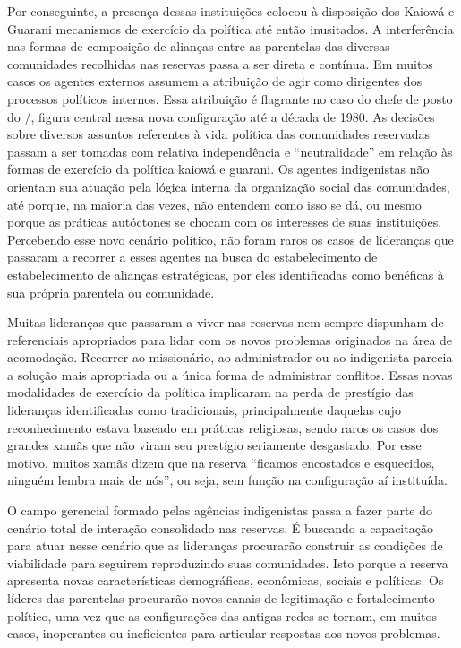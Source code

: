 Por conseguinte, a presença dessas instituições colocou à disposição dos
Kaiowá e Guarani mecanismos de exercício da política até então
inusitados. A interferência nas formas de composição de alianças entre
as parentelas das diversas comunidades recolhidas nas reservas passa a
ser direta e contínua. Em muitos casos os agentes externos assumem a
atribuição de agir como dirigentes dos processos políticos internos.
Essa atribuição é flagrante no caso do chefe de posto do /,
figura central nessa nova configuração até a década de 1980. As
decisões sobre diversos assuntos referentes à vida política das
comunidades reservadas passam a ser tomadas com relativa independência
e ``neutralidade'' em relação às formas de exercício da política kaiowá e
guarani. Os agentes indigenistas não orientam sua atuação pela lógica
interna da organização social das comunidades, até porque, na maioria
das vezes, não entendem como isso se dá, ou mesmo porque as práticas
autóctones se chocam com os interesses de suas instituições. Percebendo
esse novo cenário político, não foram raros os casos de lideranças que
passaram a recorrer a esses agentes na busca do estabelecimento de estabelecimento de alianças
estratégicas, por eles identificadas como benéficas à sua própria
parentela ou comunidade.

Muitas lideranças que passaram a viver nas reservas nem sempre dispunham
de referenciais apropriados para lidar com os novos problemas
originados na área de acomodação. Recorrer ao missionário, ao
administrador ou ao indigenista parecia a solução mais apropriada ou a
única forma de administrar conflitos. Essas novas modalidades de
exercício da política implicaram na perda de prestígio das lideranças
identificadas como tradicionais, principalmente daquelas cujo
reconhecimento estava baseado em práticas religiosas, sendo raros os
casos dos grandes xamãs que não viram seu prestígio seriamente
desgastado. Por esse motivo, muitos xamãs dizem que na reserva ``ficamos
encostados e esquecidos, ninguém lembra mais de nós'', ou seja, sem
função na configuração aí instituída.

O campo gerencial formado pelas agências indigenistas passa a fazer
parte do cenário total de interação consolidado nas reservas. É
buscando a capacitação para atuar nesse cenário que as lideranças
procurarão construir as condições de viabilidade para seguirem
reproduzindo suas comunidades. Isto porque a reserva apresenta novas
características demográficas, econômicas, sociais e políticas. Os
líderes das parentelas procurarão novos canais de legitimação e
fortalecimento político, uma vez que as configurações das antigas redes
se tornam, em muitos casos, inoperantes ou ineficientes para articular
respostas aos novos problemas. 

